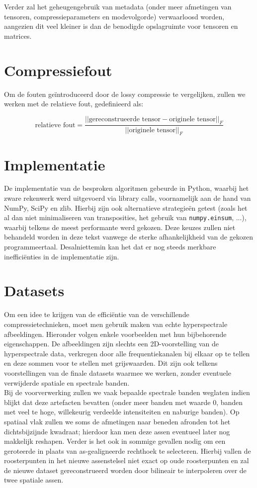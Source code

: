 Verder zal het geheugengebruik van metadata (onder meer afmetingen van tensoren, compressieparameters en modevolgorde) verwaarloosd worden, aangezien dit veel kleiner is dan de benodigde opslagruimte voor tensoren en matrices.

\section{Compressiefout}

Om de fouten ge\"introduceerd door de lossy compressie te vergelijken, zullen we werken met de relatieve fout, gedefinieerd als:

\[
\text{relatieve fout} = \frac{||\text{gereconstrueerde tensor} - \text{originele tensor}||_F}{||\text{originele tensor}||_F}
\]

\section{Implementatie}

De implementatie van de besproken algoritmen gebeurde in Python, waarbij het zware rekenwerk werd uitgevoerd via library calls, voornamelijk aan de hand van NumPy, SciPy en zlib. Hierbij zijn ook alternatieve strategie\"en getest (zoals het al dan niet minimaliseren van transposities, het gebruik van \texttt{numpy.einsum}, ...), waarbij telkens de meest performante werd gekozen. Deze keuzes zullen niet behandeld worden in deze tekst vanwege de sterke afhankelijkheid van de gekozen programmeertaal. Desalniettemin kan het dat er nog steeds merkbare ineffici\"enties in de implementatie zijn.

\section{Datasets}

Om een idee te krijgen van de effici\"entie van de verschillende compressietechnieken, moet men gebruik maken van echte hyperspectrale afbeeldingen. Hieronder volgen enkele voorbeelden met hun bijbehorende eigenschappen. De afbeeldingen zijn slechts een 2D-voorstelling van de hyperspectrale data, verkregen door alle frequentiekanalen bij elkaar op te tellen en deze sommen voor te stellen met grijswaarden. Dit zijn ook telkens voorstellingen van de finale datasets waarmee we werken, zonder eventuele verwijderde spatiale en spectrale banden.\\

Bij de voorverwerking zullen we vaak bepaalde spectrale banden weglaten indien blijkt dat deze artefacten bevatten (onder meer banden met waarde 0, banden met veel te hoge, willekeurig verdeelde intensiteiten en naburige banden). Op spatiaal vlak zullen we soms de afmetingen naar beneden afronden tot het dichtsbijzijnde kwadraat; hierdoor kan men deze assen eventueel later nog makkelijk reshapen. Verder is het ook in sommige gevallen nodig om een geroteerde in plaats van as-gealigneerde rechthoek te selecteren. Hierbij vallen de roosterpunten in het nieuwe assenstelsel niet exact op oude roosterpunten en zal de nieuwe dataset gereconstrueerd worden door bilineair te interpoleren \cite{ref:bilinear_interpolation} over de twee spatiale assen.\\

